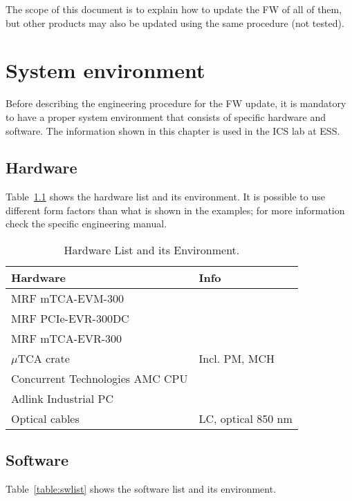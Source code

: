 \documentclass[11pt
  , a4paper
  , article
  , oneside
  , showtrims
]{memoir}
\begin{document}
The scope of this document is to explain how to update the FW of all of them, but other products may also be updated using the same procedure (not tested).\\



\chapter{System environment}
Before describing the engineering procedure for the FW update, it is mandatory to have a proper system environment that consists of specific hardware and software. The information shown in this chapter is used in the ICS lab at ESS.\\

\section{Hardware}
Table~\ref{table:hwlist} shows the hardware list and its environment. It is possible to use different form factors than what is shown in the examples; for more information check the specific engineering manual.\\

\begin{table}[!hb]
  \centering
  \begin{tabular}{l|l}
    \toprule
    Hardware                        & Info               \\\midrule
    MRF mTCA-EVM-300                &                    \\\midrule
    MRF PCIe-EVR-300DC              &                    \\\midrule
    MRF mTCA-EVR-300                &                    \\\midrule
    $\mu$TCA crate                  & Incl. PM, MCH      \\\midrule
    Concurrent Technologies AMC CPU &                    \\\midrule
    Adlink Industrial PC            &                    \\\midrule
    Optical cables                  & LC, optical 850 nm \\\bottomrule
  \end{tabular}
  \caption[]{Hardware List and its Environment.}
  \label{table:hwlist}
\end{table}

\section{Software}
Table~\ref{table:swlist} shows the software list and its environment.\\
\end{document}
